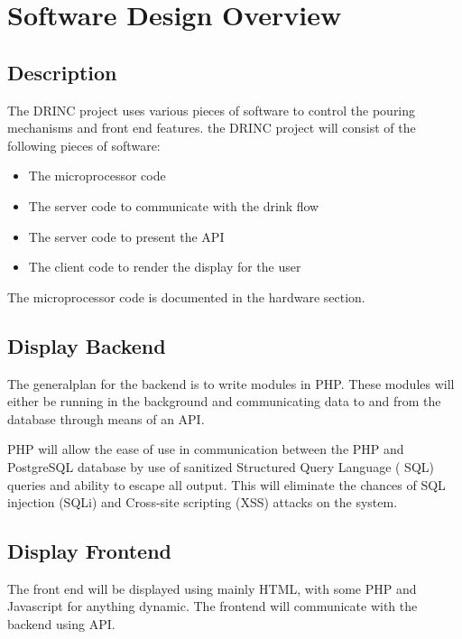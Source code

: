 \chapter{Software Design Overview}
{
    \renewcommand*{\theenumi}{\thesubsection.\arabic{enumi}}
    \renewcommand*{\theenumii}{\theenumi.\arabic{enumii}}
    \renewcommand*{\theenumiii}{\theenumii.\arabic{enumiii}}

    \section{Description}

        The DRINC project uses various pieces of software to control the 
        pouring mechanisms and front end features. the DRINC project will 
        consist of the following pieces of software:
        \begin{itemize}
            \item The microprocessor code
            \item The server code to communicate with the drink flow
            \item The server code to present the API
            \item The client code to render the display for the user
        \end{itemize}
        The microprocessor code is documented in the hardware section.

    \section{Display Backend}
        The generalplan for the backend is to write modules in PHP. These 
        modules will either be running in the background and communicating 
        data to and from the database through means of an API. 

        PHP will allow the ease of use in communication between the PHP and 
        PostgreSQL database by use of sanitized Structured Query Language (
        SQL) queries and ability to escape all output. This will eliminate 
        the chances of SQL injection (SQLi) and Cross-site scripting (XSS) 
        attacks on the system.

    \section{Display Frontend}
        The front end will be displayed using mainly HTML, with some PHP and 
        Javascript for anything dynamic. The frontend will communicate with 
        the backend using API.

}
